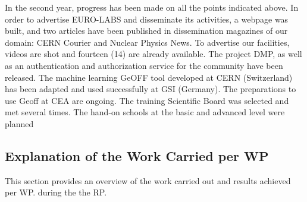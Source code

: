 In the second year, progress has been made on all the points indicated above. In order to advertise EURO-LABS and disseminate its activities, a webpage was built, and two articles have been published in dissemination magazines of our domain: CERN Courier and Nuclear Physics News. To advertise our facilities, videos are shot and fourteen (14) are already available. The project DMP, as well as an authentication and authorization service for the community have been released. The machine learning GeOFF tool developed at CERN (Switzerland) has been adapted and used successfully at GSI (Germany). The preparations to use Geoff at CEA are ongoing. The training Scientific Board was selected and met several times. The hand-on schools at the basic and advanced level were planned


\subsection{Explanation of the Work Carried per WP}

This section provides an overview of the work carried out and results achieved per WP. 
during the the  \acrshort{RP}.   







% 










